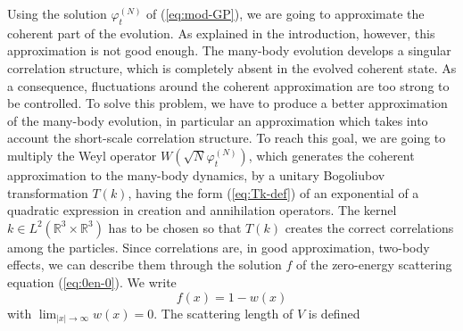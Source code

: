 \documentclass[11pt,a4paper]{article}
\newcommand{\bR}{{\mathbb R}}
\begin{document}
\medskip

Using the solution $\varphi_t^{(N)}$ of (\ref{eq:mod-GP}), we are going to approximate the coherent part of the evolution. As explained in the introduction, however, this approximation is not good enough. The many-body evolution develops a singular correlation structure, which is completely absent in the evolved coherent state. As a consequence, fluctuations around the coherent approximation are too strong to be controlled. To solve this problem, we have to produce a better approximation of the many-body evolution, in particular an approximation which takes into account the short-scale correlation structure. To reach this goal, we are going to multiply the Weyl operator $W(\sqrt{N} \varphi_t^{(N)})$, which generates the coherent approximation to the many-body dynamics, by a unitary Bogoliubov transformation $T(k)$, having the form (\ref{eq:Tk-def}) of an exponential of a quadratic expression in creation and annihilation operators. The kernel $k \in L^2 (\bR^3 \times \bR^3)$ has to be chosen so that $T(
k)$ creates the correct correlations among the particles. Since correlations are, in good approximation, two-body effects, we can describe them through the solution $f$ of the zero-energy scattering equation (\ref{eq:0en-0}). We write 
%
\begin{equation}\label{eq:wdef}
  f (x) = 1 - w (x)
\end{equation}
with $\lim_{|x|\to\infty} w(x) = 0$. The scattering length of $V$ is defined
\end{document}

